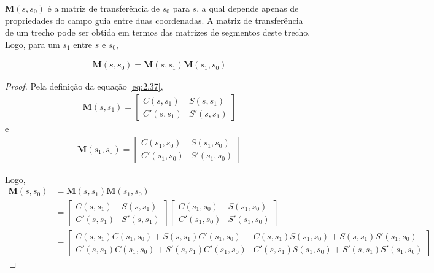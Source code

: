 $\boldsymbol{M}(s,s_0)$ é a matriz de transferência de $s_0$ para $s$, a qual depende apenas de propriedades do campo guia entre duas coordenadas. A matriz de transferência de um trecho pode ser obtida em termos das matrizes de segmentos deste trecho. Logo, para um $s_1$ entre $s$ e $s_0$,
	
\begin{align}
	\boldsymbol{M}(s,s_0) = \boldsymbol{M}(s,s_1)\boldsymbol{M}(s_1,s_0)
\end{align}
	
\begin{proof}
	Pela definição da equação \eqref{eq:2.37},
	\begin{align*}
        \boldsymbol{M}(s,s_1) = \begin{bmatrix}
        C(s,s_1) & S(s,s_1)\\
        C'(s,s_1) & S'(s,s_1)
        \end{bmatrix}
	\end{align*} e
    \begin{align*}
		\boldsymbol{M}(s_1,s_0) = \begin{bmatrix}
		C(s_1,s_0) & S(s_1,s_0)\\
		C'(s_1,s_0) & S'(s_1,s_0)
		\end{bmatrix}
	\end{align*}
	
	Logo,
	\begin{align*}
        \boldsymbol{M}(s,s_0) &= \boldsymbol{M}(s,s_1)\boldsymbol{M}(s_1,s_0)\\
        &= \begin{bmatrix}
            C(s,s_1) & S(s,s_1)\\
            C'(s,s_1) & S'(s,s_1)
            \end{bmatrix} \begin{bmatrix}
                               C(s_1,s_0) & S(s_1,s_0)\\
                              C'(s_1,s_0) & S'(s_1,s_0)
                              \end{bmatrix}\\
        &= \begin{bmatrix}
        C(s,s_1)C(s_1,s_0)+S(s,s_1)C'(s_1,s_0) & C(s,s_1)S(s_1,s_0) + S(s,s_1)S'(s_1,s_0)\\
        C'(s,s_1)C(s_1,s_0)+S'(s,s_1)C'(s_1,s_0) & C'(s,s_1)S(s_1,s_0) + S'(s,s_1)S'(s_1,s_0)
        \end{bmatrix}	
	\end{align*}
	

\end{proof}
